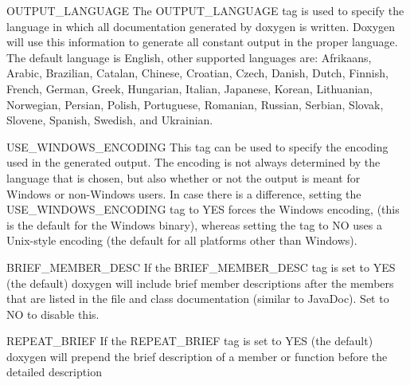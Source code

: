 \begin{DoxyDescription}
\label{config_cfg_output_language}
\hypertarget{config_cfg_output_language}{}
 
\item[{\ttfamily OUTPUT\_\-LANGUAGE} ] The {\ttfamily OUTPUT\_\-LANGUAGE} tag is used to specify the language in which all documentation generated by doxygen is written. Doxygen will use this information to generate all constant output in the proper language. The default language is English, other supported languages are: Afrikaans, Arabic, Brazilian, Catalan, Chinese, Croatian, Czech, Danish, Dutch, Finnish, French, German, Greek, Hungarian, Italian, Japanese, Korean, Lithuanian, Norwegian, Persian, Polish, Portuguese, Romanian, Russian, Serbian, Slovak, Slovene, Spanish, Swedish, and Ukrainian.

\label{config_cfg_use_windows_encoding}
\hypertarget{config_cfg_use_windows_encoding}{}
 
\item[{\ttfamily USE\_\-WINDOWS\_\-ENCODING} ] This tag can be used to specify the encoding used in the generated output. The encoding is not always determined by the language that is chosen, but also whether or not the output is meant for Windows or non-\/Windows users. In case there is a difference, setting the {\ttfamily USE\_\-WINDOWS\_\-ENCODING} tag to {\ttfamily YES} forces the Windows encoding, (this is the default for the Windows binary), whereas setting the tag to {\ttfamily NO} uses a Unix-\/style encoding (the default for all platforms other than Windows).

\label{config_cfg_brief_member_desc}
\hypertarget{config_cfg_brief_member_desc}{}
 
\item[{\ttfamily BRIEF\_\-MEMBER\_\-DESC} ] If the {\ttfamily BRIEF\_\-MEMBER\_\-DESC} tag is set to {\ttfamily YES} (the default) doxygen will include brief member descriptions after the members that are listed in the file and class documentation (similar to JavaDoc). Set to NO to disable this.

\label{config_cfg_repeat_brief}
\hypertarget{config_cfg_repeat_brief}{}
 
\item[{\ttfamily REPEAT\_\-BRIEF} ] If the {\ttfamily REPEAT\_\-BRIEF} tag is set to {\ttfamily YES} (the default) doxygen will prepend the brief description of a member or function before the detailed description


\end{DoxyDescription}
